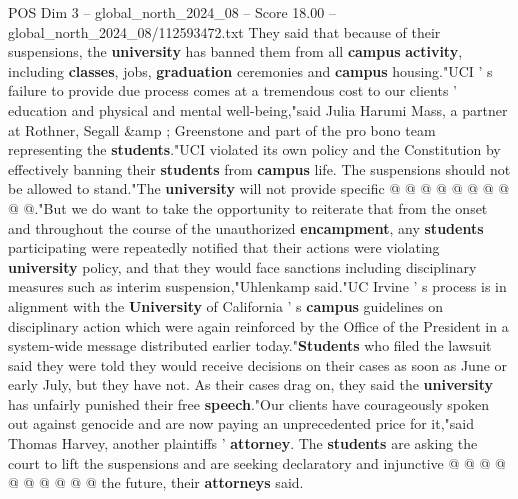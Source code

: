 \begin{textsample}{POS Dim 3 – global\_north\_2024\_08 – Score 18.00 – global\_north\_2024\_08/112593472.txt}
They said that because of their suspensions, the \textbf{university} has banned them from all \textbf{campus} \textbf{activity}, including \textbf{classes}, jobs, \textbf{graduation} ceremonies and \textbf{campus} housing."UCI ' s failure to provide due process comes at a tremendous cost to our clients ' education and physical and mental well-being,"said Julia Harumi Mass, a partner at Rothner, Segall \&amp ; Greenstone and part of the pro bono team representing the \textbf{students}."UCI violated its own policy and the Constitution by effectively banning their \textbf{students} from \textbf{campus} life.
The suspensions should not be allowed to stand."The \textbf{university} will not provide specific @ @ @ @ @ @ @ @ @ @."But we do want to take the opportunity to reiterate that from the onset and throughout the course of the unauthorized \textbf{encampment}, any \textbf{students} participating were repeatedly notified that their actions were violating \textbf{university} policy, and that they would face sanctions including disciplinary measures such as interim suspension,"Uhlenkamp said."UC Irvine ' s process is in alignment with the \textbf{University} of California ' s \textbf{campus} guidelines on disciplinary action which were again reinforced by the Office of the President in a system-wide message distributed earlier today."\textbf{Students} who filed the lawsuit said they were told they would receive decisions on their cases as soon as June or early July, but they have not.
As their cases drag on, they said the \textbf{university} has unfairly punished their free \textbf{speech}."Our clients have courageously spoken out against genocide and are now paying an unprecedented price for it,"said Thomas Harvey, another plaintiffs ' \textbf{attorney}.
The \textbf{students} are asking the court to lift the suspensions and are seeking declaratory and injunctive @ @ @ @ @ @ @ @ @ @ the future, their \textbf{attorneys} said.

\end{textsample}
